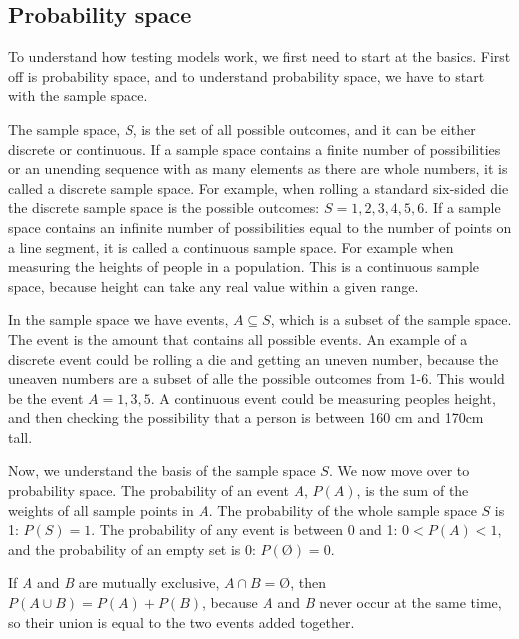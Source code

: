 \subsection{Probability space}
To understand how testing models work, we first need to start at the basics. First off is probability space, and to understand probability space, we have to start with the sample space. \newline

\noindent The sample space, \textit{S}, is the set of all possible outcomes, and it can be either discrete or continuous. If a sample space contains a finite number of possibilities or an unending sequence with as many elements as there are whole numbers, it is called a discrete sample space. For example, when rolling a standard six-sided die the discrete sample space is the possible outcomes: $S={1,2,3,4,5,6}$. If a sample space contains an infinite number of possibilities equal to the number of points on a line segment, it is called a continuous sample space. For example when measuring the heights of people in a population. This is a continuous sample space, because height can take any real value within a given range.\newline

\noindent In the sample space we have events, $A\subseteq S$, which is a subset of the sample space. The event is the amount that contains all possible events. An example of a discrete event could be rolling a die and getting an uneven number, because the uneaven numbers are a subset of alle the possible outcomes from 1-6. This would be the event $A={1,3,5}$. A continuous event could be measuring peoples height, and then checking the possibility that a person is between 160 cm and 170cm tall.
\newline

\noindent Now, we understand the basis of the sample space $S$. We now move over to probability space. The probability of an event \textit{A}, $P(A)$, is the sum of the weights of all sample points in \textit{A}.
The probability of the whole sample space $S$ is 1: $P(S)=1$. The probability of any event is between 0 and 1: $0<P(A)<1$, and the probability of an empty set is 0: $P(Ø)=0$.
\newline
\newline

\noindent If \textit{A} and \textit{B} are mutually exclusive, $A \cap B=Ø$, then $P(A \cup B) = P(A)+P(B)$, because \textit{A} and \textit{B} never occur at the same time, so their union is equal to the two events added together. 
\newline

